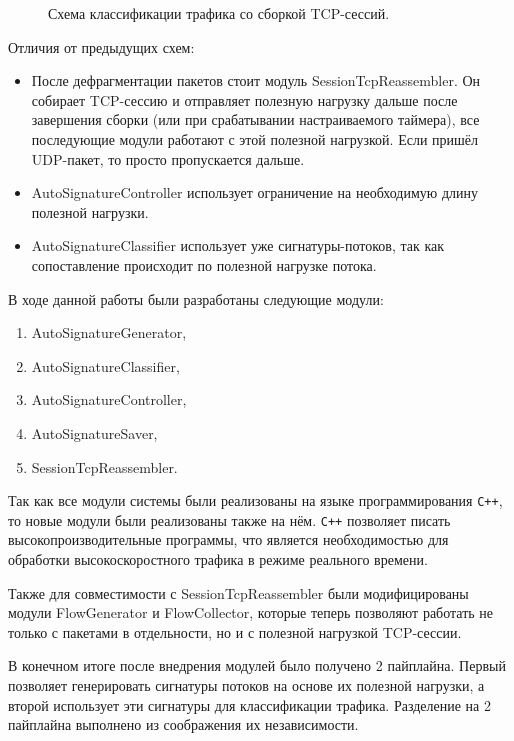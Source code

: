 \begin{figure}[H]
    \begin{center}
        
        \caption{Схема классификации трафика со сборкой TCP-сессий.}
    \end{center}
\end{figure}

Отличия от предыдущих схем:

\begin{itemize}
    \item После дефрагментации пакетов стоит модуль SessionTcpReassembler.
    Он собирает TCP-сессию и отправляет полезную нагрузку дальше после завершения сборки (или при срабатывании настраиваемого таймера),
    все последующие модули работают с этой полезной нагрузкой. Если пришёл UDP-пакет, то просто пропускается дальше.
    \item AutoSignatureController использует ограничение на необходимую длину полезной нагрузки.
    \item AutoSignatureClassifier использует уже сигнатуры-потоков, так как сопоставление происходит по полезной нагрузке потока.
\end{itemize}

В ходе данной работы были разработаны следующие модули:
\begin{enumerate}
    \item AutoSignatureGenerator,
    \item AutoSignatureClassifier,
    \item AutoSignatureController,
    \item AutoSignatureSaver,
    \item SessionTcpReassembler.
\end{enumerate}

Так как все модули системы были реализованы на языке программирования \verb!C++!, то новые модули были реализованы также на нём.
\verb!C++! позволяет писать высокопроизводительные программы, что является необходимостью
для обработки высокоскоростного трафика в режиме реального времени.

Также для совместимости с SessionTcpReassembler были модифицированы модули FlowGenerator и FlowCollector,
которые теперь позволяют работать не только с пакетами в отдельности, но и с полезной нагрузкой TCP-сессии.

В конечном итоге после внедрения модулей было получено 2 пайплайна.
Первый позволяет генерировать сигнатуры потоков на основе их полезной нагрузки,
а второй использует эти сигнатуры для классификации трафика.
Разделение на 2 пайплайна выполнено из соображения их независимости.

\newpage
